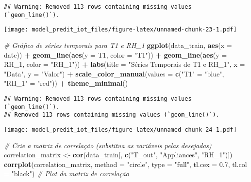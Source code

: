 \documentclass[
]{article}
\newenvironment{Shaded}{\begin{snugshade}}{\end{snugshade}}
\newcommand{\AttributeTok}[1]{\textcolor[rgb]{0.13,0.29,0.53}{#1}}
\newcommand{\CommentTok}[1]{\textcolor[rgb]{0.56,0.35,0.01}{\textit{#1}}}
\newcommand{\FloatTok}[1]{\textcolor[rgb]{0.00,0.00,0.81}{#1}}
\newcommand{\FunctionTok}[1]{\textcolor[rgb]{0.13,0.29,0.53}{\textbf{#1}}}
\newcommand{\NormalTok}[1]{#1}
\newcommand{\OtherTok}[1]{\textcolor[rgb]{0.56,0.35,0.01}{#1}}
\newcommand{\SpecialCharTok}[1]{\textcolor[rgb]{0.81,0.36,0.00}{\textbf{#1}}}
\newcommand{\StringTok}[1]{\textcolor[rgb]{0.31,0.60,0.02}{#1}}
\begin{document}
\begin{verbatim}
## Warning: Removed 113 rows containing missing values (`geom_line()`).
\end{verbatim}

\texttt{[image: model\_predit\_iot\_files/figure-latex/unnamed-chunk-23-1.pdf]}

\begin{Shaded}
\begin{Highlighting}[]
\CommentTok{\# Gráfico de séries temporais para T1 e RH\_1}
\FunctionTok{ggplot}\NormalTok{(data\_train, }\FunctionTok{aes}\NormalTok{(}\AttributeTok{x =}\NormalTok{ date)) }\SpecialCharTok{+}
  \FunctionTok{geom\_line}\NormalTok{(}\FunctionTok{aes}\NormalTok{(}\AttributeTok{y =}\NormalTok{ T1, }\AttributeTok{color =} \StringTok{"T1"}\NormalTok{)) }\SpecialCharTok{+}
  \FunctionTok{geom\_line}\NormalTok{(}\FunctionTok{aes}\NormalTok{(}\AttributeTok{y =}\NormalTok{ RH\_1, }\AttributeTok{color =} \StringTok{"RH\_1"}\NormalTok{)) }\SpecialCharTok{+}
  \FunctionTok{labs}\NormalTok{(}\AttributeTok{title =} \StringTok{"Séries Temporais de T1 e RH\_1"}\NormalTok{,}
       \AttributeTok{x =} \StringTok{"Data"}\NormalTok{,}
       \AttributeTok{y =} \StringTok{"Valor"}\NormalTok{) }\SpecialCharTok{+}
  \FunctionTok{scale\_color\_manual}\NormalTok{(}\AttributeTok{values =} \FunctionTok{c}\NormalTok{(}\StringTok{"T1"} \OtherTok{=} \StringTok{"blue"}\NormalTok{, }\StringTok{"RH\_1"} \OtherTok{=} \StringTok{"red"}\NormalTok{)) }\SpecialCharTok{+}
  \FunctionTok{theme\_minimal}\NormalTok{()}
\end{Highlighting}
\end{Shaded}

\begin{verbatim}
## Warning: Removed 113 rows containing missing values (`geom_line()`).
## Removed 113 rows containing missing values (`geom_line()`).
\end{verbatim}

\texttt{[image: model\_predit\_iot\_files/figure-latex/unnamed-chunk-24-1.pdf]}

\begin{Shaded}
\begin{Highlighting}[]
\CommentTok{\# Crie a matriz de correlação (substitua as variáveis pelas desejadas)}
\NormalTok{correlation\_matrix }\OtherTok{\textless{}{-}} \FunctionTok{cor}\NormalTok{(data\_train[, }\FunctionTok{c}\NormalTok{(}\StringTok{"T\_out"}\NormalTok{, }\StringTok{"Appliances"}\NormalTok{, }\StringTok{"RH\_1"}\NormalTok{)])}
\FunctionTok{corrplot}\NormalTok{(correlation\_matrix, }\AttributeTok{method =} \StringTok{"circle"}\NormalTok{, }\AttributeTok{type =} \StringTok{"full"}\NormalTok{, }\AttributeTok{tl.cex =} \FloatTok{0.7}\NormalTok{, }\AttributeTok{tl.col =} \StringTok{"black"}\NormalTok{) }\CommentTok{\# Plot da matriz de correlação}
\end{Highlighting}
\end{Shaded}
\end{document}
